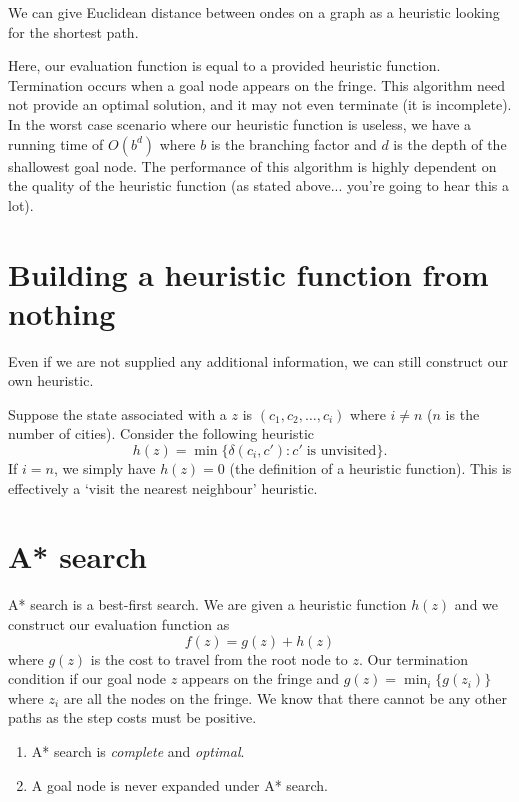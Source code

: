 \begin{example}
    We can give Euclidean distance between ondes on a graph as a heuristic looking for the shortest path. 
\end{example}

\begin{example}
    Here, our evaluation function is equal to a provided heuristic function. Termination occurs when a goal node appears on the fringe. This algorithm need not provide an optimal solution, and it may not even terminate (it is incomplete). In the worst case scenario where our heuristic function is useless, we have a running time of $O(b^d)$ where $b$ is the branching factor and $d$ is the depth of the shallowest goal node. The performance of this algorithm is highly dependent on the quality of the heuristic function (as stated above... you're going to hear this a lot).
\end{example}

\section{Building a heuristic function from nothing}

Even if we are not supplied any additional information, we can still construct our own heuristic.

\begin{example}
    Suppose the state associated with a $z$ is $(c_1, c_2, \ldots, c_i)$ where $i \neq n$ ($n$ is the number of cities). Consider the following heuristic
    \[ h(z) = \min{\{\delta(c_i, c') : c' \;\text{is unvisited}\}}. \]
    If $i = n$, we simply have $h(z) = 0$ (the definition of a heuristic function). This is effectively a `visit the nearest neighbour' heuristic.
\end{example}

\section{A* search}

A* search is a best-first search. We are given a heuristic function $h(z)$ and we construct our evaluation function as 
\[ f(z) = g(z) + h(z) \]
where $g(z)$ is the cost to travel from the root node to $z$. Our termination condition if our goal node $z$ appears on the fringe and $g(z) = \min_i\{g(z_i)\}$ where $z_i$ are all the nodes on the fringe. We know that there cannot be any other paths as the step costs must be positive.

\begin{remark}
    \begin{enumerate}
        \item A* search is \emph{complete} and \emph{optimal}.
        \item A goal node is never expanded under A* search.
    \end{enumerate}
\end{remark}
